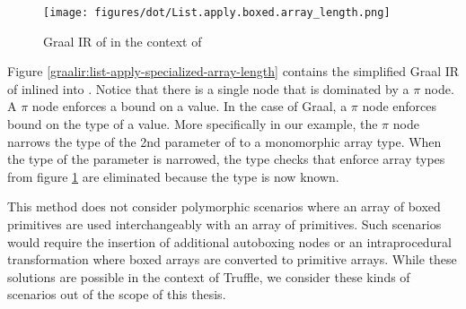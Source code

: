 \begin{figure}
	\centering
	\texttt{[image: figures/dot/List.apply.boxed.array\_length.png]}
	\caption{Graal IR of  in the context of }
	\label{graalir:list-apply-boxed-array-length}
\end{figure}

Figure \ref{graalir:list-apply-specialized-array-length} contains the simplified Graal IR of  inlined into .
Notice that there is a single  node that is dominated by a $\pi$ node.
A $\pi$ node\cite{abdc:pi-nodes} enforces a bound on a value.
In the case of Graal, a $\pi$ node enforces bound on the type of a value.
More specifically in our example, the $\pi$ node narrows the type of the 2nd parameter of  to a monomorphic array type.
When the type of the parameter is narrowed, the type checks that enforce array types from figure \ref{graalir:list-apply-boxed-array-length} are eliminated because the type is now known.

This method does not consider polymorphic scenarios where an array of boxed primitives are used interchangeably with an array of primitives.
Such scenarios would require the insertion of additional autoboxing nodes or an intraprocedural transformation where boxed arrays are converted to primitive arrays.
While these solutions are possible in the context of Truffle, we consider these kinds of scenarios out of the scope of this thesis.



